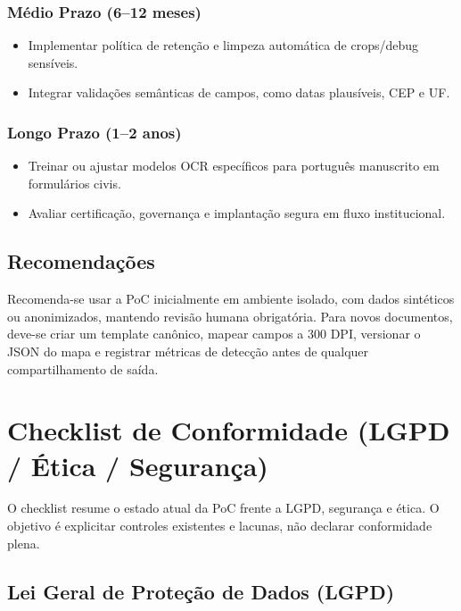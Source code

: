\documentclass[12pt,a4paper]{article}
\begin{document}
\subsubsection{Médio Prazo (6–12 meses)}
\begin{itemize}
    \item{} Implementar política de retenção e limpeza automática de crops/debug sensíveis.
    \item{} Integrar validações semânticas de campos, como datas plausíveis, CEP e UF.
\end{itemize}

\subsubsection{Longo Prazo (1–2 anos)}
\begin{itemize}
    \item{} Treinar ou ajustar modelos OCR específicos para português manuscrito em formulários civis.
    \item{} Avaliar certificação, governança e implantação segura em fluxo institucional.
\end{itemize}

\subsection{Recomendações}

Recomenda-se usar a PoC inicialmente em ambiente isolado, com dados sintéticos ou anonimizados, mantendo revisão humana obrigatória. Para novos documentos, deve-se criar um template canônico, mapear campos a 300 DPI, versionar o JSON do mapa e registrar métricas de detecção antes de qualquer compartilhamento de saída.

\section{Checklist de Conformidade (LGPD / Ética / Segurança)}
\label{sec:checklist}

O checklist resume o estado atual da PoC frente a LGPD, segurança e ética. O objetivo é explicitar controles existentes e lacunas, não declarar conformidade plena.

\subsection{Lei Geral de Proteção de Dados (LGPD)}
\end{document}
